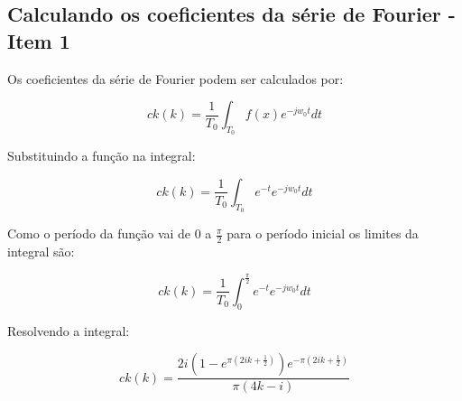 \documentclass[11pt]{article}
\begin{document}
    \hypertarget{calculando-os-coeficientes-da-suxe9rie-de-fourier---item-1}{%
\subsection{Calculando os coeficientes da série de Fourier - Item
1}\label{calculando-os-coeficientes-da-suxe9rie-de-fourier---item-1}}

Os coeficientes da série de Fourier podem ser calculados por:

\[ck(k) = \frac{1}{T_0} \int_{T_0} f(x)e^{-j w_0 t}dt\]

Substituindo a função na integral:

\[ck(k) = \frac{1}{T_0} \int_{T_0} e^{-t} e^{-j w_0 t}dt\]

Como o período da função vai de 0 a \(\frac{\pi}{2}\) para o período
inicial os limites da integral são:

\[ck(k) = \frac{1}{T_0} \int_{0}^{\frac{\pi}{2}} e^{-t} e^{-j w_0 t}dt\]

Resolvendo a integral:

\[ck(k) = \frac{2 i \left(1 - e^{\pi \left(2 i k + \frac{1}{2}\right)}\right) e^{- \pi \left(2 i k + \frac{1}{2}\right)}}{\pi \left(4 k - i\right)}\]
\end{document}
